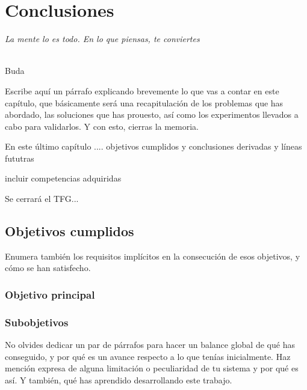 \chapter{Conclusiones}
\label{cap:capitulo8}

\begin{flushright}
\begin{minipage}[]{10cm}
\emph{La mente lo es todo. En lo que piensas, te conviertes}\\
\end{minipage}\\

Buda\\
\end{flushright}

\vspace{1cm}

Escribe aquí un párrafo explicando brevemente lo que vas a contar en este capítulo, que básicamente será una recapitulación de los problemas que has abordado, las soluciones que has prouesto, así como los experimentos llevados a cabo para validarlos. Y con esto, cierras la memoria.

En este último capítulo .... objetivos cumplidos y conclusiones derivadas y líneas fututras 

incluir competencias adquiridas 

Se cerrará el TFG...

\section{Objetivos cumplidos}

Enumera también los requisitos implícitos en la consecución de esos objetivos, y cómo se han satisfecho.\\

\subsection{Objetivo principal}

\subsection{Subobjetivos}

No olvides dedicar un par de párrafos para hacer un balance global de qué has conseguido, y por qué es un avance respecto a lo que tenías inicialmente. Haz mención expresa de alguna limitación o peculiaridad de tu sistema y por qué es así. Y también, qué has aprendido desarrollando este trabajo.\\

